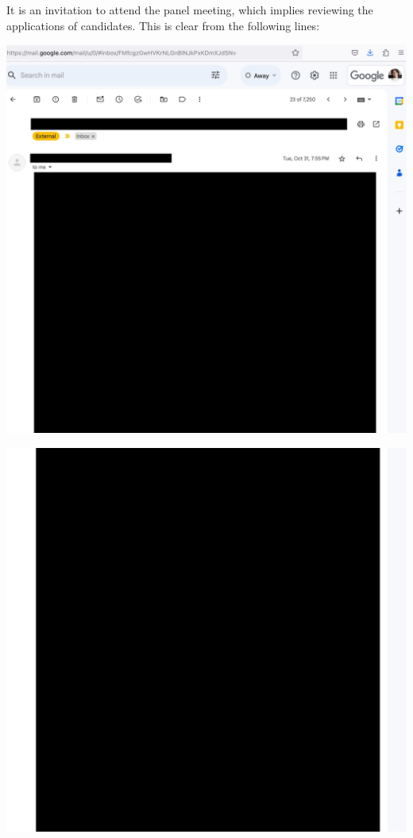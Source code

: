 
It is an invitation to attend the panel meeting,
which implies reviewing the applications of candidates.
This is clear from the following lines: \Quote{%
    <\dots>%
}

\begin{center}
    \includegraphics[width=40em]{invitation-p1_public}
\end{center}
\WillContinue
\pagebreak

\Continuing
\begin{center}
    \includegraphics[width=40em]{invitation-p2_public}
\end{center}

\pagebreak
